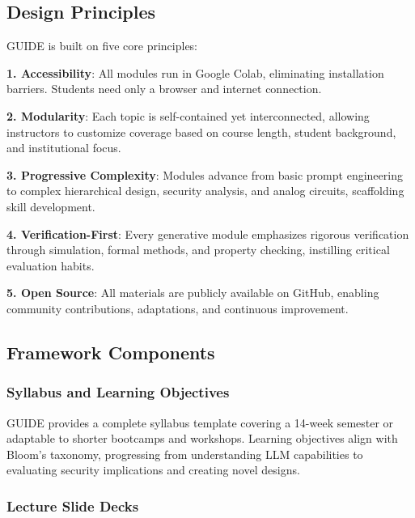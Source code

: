\documentclass[10pt,conference]{IEEEtran}
\begin{document}
\subsection{Design Principles}

GUIDE is built on five core principles:

\textbf{1. Accessibility}: All modules run in Google Colab, eliminating installation barriers. Students need only a browser and internet connection.

\textbf{2. Modularity}: Each topic is self-contained yet interconnected, allowing instructors to customize coverage based on course length, student background, and institutional focus.

\textbf{3. Progressive Complexity}: Modules advance from basic prompt engineering to complex hierarchical design, security analysis, and analog circuits, scaffolding skill development.

\textbf{4. Verification-First}: Every generative module emphasizes rigorous verification through simulation, formal methods, and property checking, instilling critical evaluation habits.

\textbf{5. Open Source}: All materials are publicly available on GitHub, enabling community contributions, adaptations, and continuous improvement.

\subsection{Framework Components}

\subsubsection{Syllabus and Learning Objectives}

GUIDE provides a complete syllabus template covering a 14-week semester or adaptable to shorter bootcamps and workshops. Learning objectives align with Bloom's taxonomy, progressing from understanding LLM capabilities to evaluating security implications and creating novel designs.

\subsubsection{Lecture Slide Decks}
\end{document}
